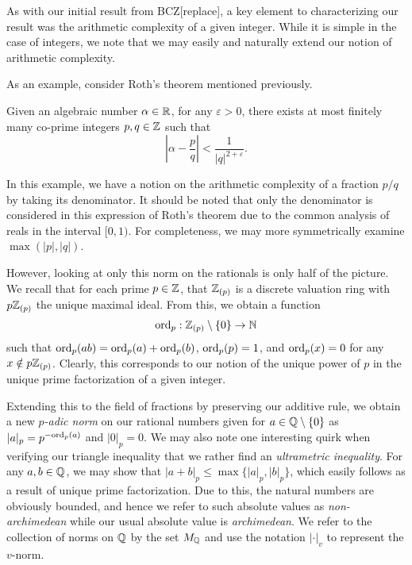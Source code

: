 \documentclass[12pt]{article}
\begin{document}
    As with our initial result from BCZ[replace], 
    a key element to characterizing our result was the arithmetic complexity of a given integer.
    While it is simple in the case of integers, 
    we note that we may easily and naturally extend our notion of arithmetic complexity.

    As an example, consider Roth's theorem mentioned previously.

    \begin{theorem}
        Given an algebraic number $\alpha \in \mathbb{R}$, for any $\varepsilon > 0$,
        there exists at most finitely many co-prime integers $p, q \in \mathbb{Z}$ such that
        \[
            \left|\alpha - \frac{p}{q}\right| < \frac{1}{|q|^{2 + \varepsilon}}.
        \]
    \end{theorem}

    In this example, we have a notion on the arithmetic complexity of a fraction $p/q$ by taking its denominator.
    It should be noted that only the denominator is considered in this expression of Roth's theorem due to the common analysis of reals in the interval $[0, 1)$.
    For completeness, we may more symmetrically examine $\max(|p|, |q|)$.

    However, looking at only this norm on the rationals is only half of the picture.
    We recall that for each prime $p \in \mathbb{Z}$, 
    that $\mathbb{Z}_{(p)}$ is a discrete valuation ring with $p\mathbb{Z}_{(p)}$ the unique maximal ideal.
    From this, we obtain a function
    \[
        {\rm ord}_p : \mathbb{Z}_{(p)} \setminus \{0\} \to \mathbb{N}
    \]
    such that ${\rm ord}_p(ab) = {\rm ord}_p(a) + {\rm ord}_p(b)$, ${\rm ord}_p(p) = 1$, and ${\rm ord}_p(x) = 0$ for any $x \notin p\mathbb{Z}_{(p)}$.
    Clearly, this corresponds to our notion of the unique power of $p$ in the unique prime factorization of a given integer.
    
    Extending this to the field of fractions by preserving our additive rule,
    we obtain a new \textit{$p$-adic norm} on our rational numbers given for $a \in \mathbb{Q} \setminus \{0\}$ as $|a|_p = p^{-{\rm ord}_p(a)}$ and $|0|_p = 0$.
    We may also note one interesting quirk when verifying our triangle inequality that we rather find an \textit{ultrametric inequality}.
    For any $a, b \in \mathbb{Q}$, we may show that $|a + b|_p \leq \max\{|a|_p, |b|_p\}$,
    which easily follows as a result of unique prime factorization.
    Due to this, the natural numbers are obviously bounded,
    and hence we refer to such absolute values as \textit{non-archimedean} while our usual absolute value is \textit{archimedean}.
    We refer to the collection of norms on $\mathbb{Q}$ by the set $M_{\mathbb{Q}}$ and use the notation $|\cdot|_v$ to represent the $v$-norm.
\end{document}

